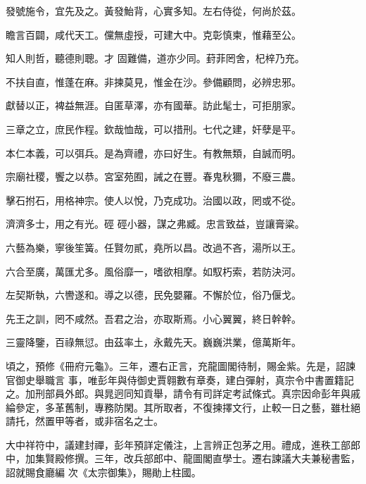 \begin{pinyinscope}
 發號施令，宜先及之。黃發鮐背，心實多知。左右侍從，何尚於茲。



 瞻言百闢，咸代天工。儻無虛授，可建大中。克彰慎柬，惟藉至公。



 知人則哲，聽德則聰。才
 固難備，道亦少同。葑菲罔舍，杞梓乃充。



 不扶自直，惟蓬在麻。非揀莫見，惟金在沙。參備顧問，必辨忠邪。



 獻替以正，裨益無涯。自匿草澤，亦有國華。訪此髦士，可拒朋家。



 三章之立，庶民作程。欽哉恤哉，可以措刑。七代之建，奸孽是平。



 本仁本義，可以弭兵。是為齊禮，亦曰好生。有教無類，自誠而明。



 宗廟社稷，饗之以恭。宮室苑囿，誡之在豐。春鬼秋獮，不廢三農。



 擊石拊石，用格神宗。使人以悅，乃克成功。治國以政，罔或不從。



 濟濟多士，用之有光。硜
 硜小器，謀之弗臧。忠言致益，豈讓膏粱。



 六藝為樂，寧後笙簧。任賢勿貳，堯所以昌。改過不吝，湯所以王。



 六合至廣，萬匯尤多。風俗靡一，嗜欲相摩。如馭朽索，若防決河。



 左契斯執，六轡遂和。導之以德，民免嬰羅。不懈於位，俗乃偃戈。



 先王之訓，罔不咸然。吾君之治，亦取斯焉。小心翼翼，終日幹幹。



 三靈降鑒，百祿無愆。由茲率土，永戴先天。巍巍洪業，億萬斯年。



 頃之，預修《冊府元龜》。三年，遷右正言，充龍圖閣待制，賜金紫。先是，詔諫官御史舉職言
 事，唯彭年與侍御史賈翱數有章奏，建白彈射，真宗令中書置籍記之。加刑部員外郎。與晁迥同知貢舉，請令有司詳定考試條式。真宗因命彭年與戚綸參定，多革舊制，專務防閑。其所取者，不復揀擇文行，止較一日之藝，雖杜絕請托，然置甲等者，或非宿名之士。



 大中祥符中，議建封禪，彭年預詳定儀注，上言辨正包茅之用。禮成，進秩工部郎中，加集賢殿修撰。三年，改兵部郎中、龍圖閣直學士。遷右諫議大夫兼秘書監，詔就賜食廳編
 次《太宗御集》，賜勛上柱國。




\end{pinyinscope}
